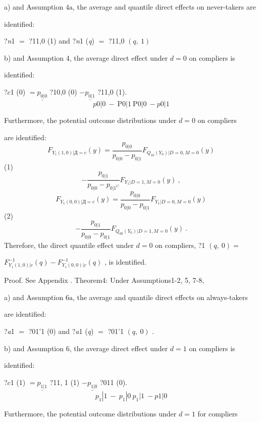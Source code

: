 \documentclass[a4paper,12pt]{article}
\begin{document}
a) and Assumption $4\mathrm{a}$, the average and quantile direct effects on never-takers are

identified:

?{\it n}1 $=$ ?11,0 (1) and ?{\it n}1 ({\it q}) $=$ ?11,0 $(q,\ 1)$

b) and Assumption 4, the average direct effect under $d = 0$ on compliers is

identified:
\begin{center}
?$c$1 (0) $= \underline{p_{0|0}}$ ?10,0 (0) $- \underline{p_{0|1}}$ ?11,0 (1).
$$
p0|0\ -\ \mathrm{P}0|1\ \mathrm{P}0|0\ -p0|1
$$
\end{center}
Furthermore, the potential outcome distributions under $d = 0$ on compliers

are identified:
$$
F_{Y_{1}(1,0)|Д=c}(y)=\frac{p_{0|0}}{p_{0|0}-p_{0|1}}F_{Q_{10}(Y_{0})|D=0,M=0}(y)
$$
(1)
$$
-\frac{p_{0|1}}{p_{0|0}-p_{0|1^{C}}}F_{Y_{1}|D=1,M=0}(y)\ ,
$$
$$
F_{Y_{1}(0,0)|Д=c}(y)=\frac{p_{0|0}}{p_{0|0}-p_{0|1}}F_{Y_{1}|D=0,M=0}(y)
$$
(2)
$$
-\frac{p_{0|1}}{p_{0|0}-p_{0|1}}F_{Q_{00}(Y_{0})|D=1,M=0}(y)\ .
$$
Therefore, the direct quantile effect under $d = 0$ on compliers, ?1 $(q,\ 0) =$

$F_{Y_{1}(1,0)|c}^{-1}(q)-F_{Y_{1}(0,0)|c}^{-1}(q)$ , is identified.

Proof. See Appendix . Theorem4: Under Assumptions1-2, 5, 7-8,

a) and Assumption $6\mathrm{a}$, the average and quantile direct effects on always-takers

are identified:

?{\it a}1 $=$ ?01'1 (0) and ?{\it a}1 ({\it q}) $=$ ?01'1 $(q,\ 0)$ .

b) and Assumption 6, the average direct effect under $d = 1$ on compliers is

identified:
\begin{center}
?$c$1 (1) $= \underline{p_{1|1}}$ ?11, 1 (1) $- \underline{p_{1|0}}$ ?011 (0).
$$
p_{1}|1\ -\ p_{1}|0\ p_{1}|1\ -p1|0
$$
\end{center}
Furthermore, the potential outcome distributions under $d=1$ for compliers
\end{document}

